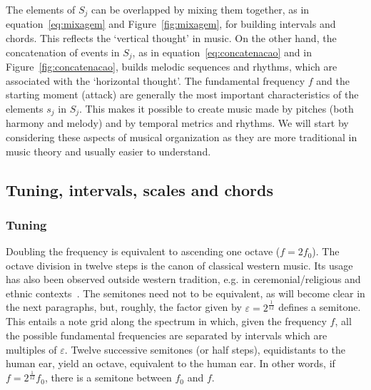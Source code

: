 The elements of $S_j$ can be overlapped by mixing them together, as in
equation~\ref{eq:mixagem} and Figure~\ref{fig:mixagem}, for building intervals and chords. This reflects the `vertical thought' in music. On the other hand, the concatenation of events
in $S_j$, as in equation~\ref{eq:concatenacao} and in Figure~\ref{fig:concatenacao}, builds melodic sequences and rhythms, which are associated with the `horizontal thought'. The fundamental frequency $f$ and the starting moment
(attack) are generally the most important characteristics of the elements $s_j$ in $S_j$. This makes it possible to create music made by pitches (both harmony and melody) and by temporal metrics and rhythms.
We will start by considering these aspects of musical organization as they are more traditional in music theory and usually easier to understand.

\subsection{Tuning, intervals, scales and chords}\label{subsec:afinacao}
\subsubsection{Tuning}
Doubling the frequency is equivalent to ascending one octave ($f=2f_0$). The octave division in twelve steps is the canon of classical western music. Its usage has also been observed
outside western tradition, e.g. in ceremonial/religious and ethnic contexts~\cite{Wisnick}. The semitones need not to be equivalent, as will become clear in the next paragraphs, but, roughly, the factor given by $\varepsilon=2^{\frac{1}{12}}$ defines a semitone. This entails a note grid along the spectrum in which, given the frequency $f$, all the possible fundamental frequencies are separated by intervals which are multiples of $\varepsilon$. Twelve successive semitones (or half steps), equidistants to the human ear, yield an
octave, equivalent to the human ear. In other words, if $f=2^{\frac{1}{12}}f_0$, there is a semitone between
$f_0$ and $f$.

